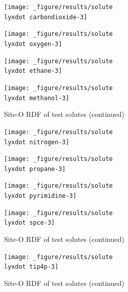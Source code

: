 \begin{figure}[H]
\ContinuedFloat
\begin{centering}
\texttt{[image: \_figure/results/solute\\lyxdot carbondioxide-3]}
\par\end{centering}
\begin{centering}
\texttt{[image: \_figure/results/solute\\lyxdot oxygen-3]}
\par\end{centering}
\begin{centering}
\texttt{[image: \_figure/results/solute\\lyxdot ethane-3]}
\par\end{centering}
\begin{centering}
\texttt{[image: \_figure/results/solute\\lyxdot methanol-3]}
\par\end{centering}
\caption[]{Site-O \acs{RDF} of test solutes (continued)}
\end{figure}

\begin{figure}[H]
\ContinuedFloat
\begin{centering}
\texttt{[image: \_figure/results/solute\\lyxdot nitrogen-3]}
\par\end{centering}
\begin{centering}
\texttt{[image: \_figure/results/solute\\lyxdot propane-3]}
\par\end{centering}
\begin{centering}
\texttt{[image: \_figure/results/solute\\lyxdot pyrimidine-3]}
\par\end{centering}
\begin{centering}
\texttt{[image: \_figure/results/solute\\lyxdot spce-3]}
\par\end{centering}
\caption[]{Site-O \acs{RDF} of test solutes (continued)}
\end{figure}

\begin{figure}[H]
\ContinuedFloat
\begin{centering}
\texttt{[image: \_figure/results/solute\\lyxdot tip4p-3]}
\par\end{centering}
\caption[]{Site-O \acs{RDF} of test solutes (continued)}
\end{figure}

